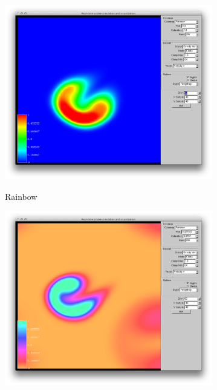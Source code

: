 \begin{figure}[htbp]
\centering
\begin{minipage}[t]{0.48\textwidth}
        \includegraphics[height=3in]{figures/colormaps/rainbowSmoke.png}
\caption{Rainbow}
\label{fig:revised:modelingLanguages}
\end{minipage}\hspace{.04\textwidth}%
\begin{minipage}[t]{0.48\textwidth}
        \includegraphics[height=3in]{figures/colormaps/hueAndSaturation.png}

    \caption{}
    \label{fig:revised:reqFormat}
\end{minipage}
\end{figure}


